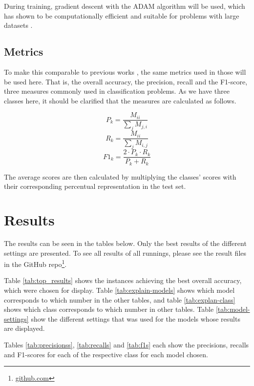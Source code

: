 \documentclass[twocolumn]{article}
\begin{document}
During training, gradient descent with the ADAM algorithm will be used, which has shown to be computationally efficient and suitable for problems with large datasets \cite{Kingma2014AdamAM}. 

\subsection{Metrics}

To make this comparable to previous works \cite{Gambck2017, DLNN, gaydhani}, the same metrics used in those will be used here. That is, the overall accuracy, the precision, recall and the F1-score, three measures commonly used in classification problems. As we have three classes here, it should be clarified that the measures are calculated as follows. 

\begin{equation}
P_k = \frac{M_{ii}}{\sum_j M_{j,i}}
\end{equation}
\begin{equation}
R_k = \frac{M_{ii}}{\sum_j M_{i,j}}
\end{equation}
\begin{equation}
F1_k = \frac{2\cdot P_k \cdot R_k}{P_k + R_k}
\end{equation}

The average scores are then calculated by multiplying the classes' scores with their corresponding percentual representation in the test set. 
\section{Results}

The results can be seen in the tables below. Only the best results of the different settings are presented. To see all results of all runnings, please see the result files in the GitHub repo\footnote{\url{github.com}}. 

Table \ref{tab:top_results} shows the instances achieving the best overall accuracy, which were chosen for display. Table \ref{tab:explain-models} shows which model corresponds to which number in the other tables, and table \ref{tab:explan-class} shows which class corresponds to which number in other tables. Table \ref{tab:model-settings} show the different settings that was used for the models whose results are displayed. 

Tables \ref{tab:precisionss}, \ref{tab:recalls} and \ref{tab:f1s} each show the precisions, recalls and F1-scores for each of the respective class for each model chosen. 
\end{document}
